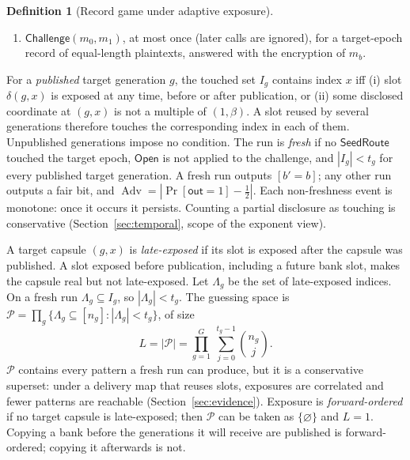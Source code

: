 \documentclass[pdflatex,sn-mathphys-num,twocolumn]{sn-jnl}
\theoremstyle{plain}
\theoremstyle{definition}
\newtheorem{definition}[theorem]{Definition}
\newcommand{\Adv}{\operatorname{Adv}}
\begin{document}
\begin{definition}[Record game under adaptive exposure]
\begin{enumerate}
\item $\mathsf{Challenge}(m_0,m_1)$, at most once (later calls are ignored), for a target-epoch record of equal-length plaintexts, answered with the encryption of $m_b$.
\end{enumerate}
For a \emph{published} target generation $g$, the touched set $I_g$ contains index $x$ iff (i) slot $\delta(g,x)$ is exposed at any time, before or after publication, or (ii) some disclosed coordinate at $(g,x)$ is not a multiple of $(1,\beta)$. A slot reused by several generations therefore touches the corresponding index in each of them. Unpublished generations impose no condition. The run is \emph{fresh} if no $\mathsf{SeedRoute}$ touched the target epoch, $\mathsf{Open}$ is not applied to the challenge, and $|I_g|<t_g$ for every published target generation. A fresh run outputs $[b'=b]$; any other run outputs a fair bit, and $\Adv=|\Pr[\mathsf{out}=1]-\tfrac12|$. Each non-freshness event is monotone: once it occurs it persists. Counting a partial disclosure as touching is conservative (Section~\ref{sec:temporal}, scope of the exponent view).
\end{definition}

A target capsule $(g,x)$ is \emph{late-exposed} if its slot is exposed after the capsule was published. A slot exposed before publication, including a future bank slot, makes the capsule real but not late-exposed. Let $\Lambda_g$ be the set of late-exposed indices. On a fresh run $\Lambda_g\subseteq I_g$, so $|\Lambda_g|<t_g$. The guessing space is $\mathcal P=\prod_g\{\Lambda_g\subseteq[n_g]:|\Lambda_g|<t_g\}$, of size
\begin{equation}\label{eq:L}
 L=|\mathcal P|=\prod_{g=1}^{G}\ \sum_{j=0}^{t_g-1}\binom{n_g}{j}.
\end{equation}
$\mathcal P$ contains every pattern a fresh run can produce, but it is a conservative superset: under a delivery map that reuses slots, exposures are correlated and fewer patterns are reachable (Section~\ref{sec:evidence}). Exposure is \emph{forward-ordered} if no target capsule is late-exposed; then $\mathcal P$ can be taken as $\{\varnothing\}$ and $L=1$. Copying a bank before the generations it will receive are published is forward-ordered; copying it afterwards is not.
\end{document}
